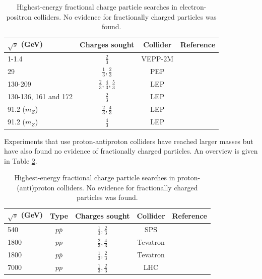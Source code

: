 \begin{table}[]
\caption{Highest-energy fractional charge particle searches in electron-positron colliders. No evidence for fractionally charged particles was found.}
\label{tab:elecposcollider}
\centering
\begin{tabular}{|l|c|c|c|}
\hline
\rowcolor[HTML]{9B9B9B} 
$\sqrt{s}$ (GeV) & Charges sought                        & Collider &Reference\\ \hline
1-1.4		 & $\frac{2}{3}$						 & VEPP-2M  & \cite{Bondar:1985sb} \\ \hline
29			 & $\frac{1}{3},\frac{2}{3}$			 & PEP & \cite{Aihara:1984px} \\ \hline		
130-209      & $\frac{2}{3},\frac{4}{3},\frac{5}{3}$ & LEP & \cite{Abbiendi:2003yd}    \\ \hline
130-136, 161 and 172 & $\frac{2}{3}$                 & LEP & \cite{Abreu:1996py}    \\ \hline
91.2 ($m_Z$) & $\frac{2}{3},\frac{4}{3}$             & LEP & \cite{Akers:1995az}    \\ \hline
91.2 ($m_Z$) & $\frac{4}{3}$   	    			     & LEP & \cite{Buskulic:1992mr}  \\ \hline
\end{tabular}
\end{table}

Experiments that use proton-antiproton colliders have reached larger masses but have also found no evidence of fractionally charged particles. An overview is given in Table \ref{tab:protonantiprotoncollider}.


\begin{table}[]
\caption{Highest-energy fractional charge particle searches in proton-(anti)proton colliders. No evidence for fractionally charged particles was found.}
\label{tab:protonantiprotoncollider}
\centering
\begin{tabular}{|l|c|c|c|c|}
\hline
\rowcolor[HTML]{9B9B9B} 
$\sqrt{s}$ (GeV) & Type & Charges sought            & Collider & Reference \\ \hline
540		 & $p\overline{p}$ & $\frac{1}{3},\frac{2}{3}$ & SPS      & \cite{Banner:1985ev} \\ \hline
1800          & $p\overline{p}$ & $\frac{2}{3},\frac{4}{3}$ & Tevatron & \cite{Abe:1992vr}         \\ \hline
1800          & $p\overline{p}$ & $\frac{1}{3},\frac{2}{3}$ & Tevatron & \cite{Acosta:2002ju} \\ \hline
7000          & $pp$ & $\frac{1}{3},\frac{2}{3}$ & LHC & \cite{CMS:2012xi} \\ \hline

\end{tabular}
\end{table}

